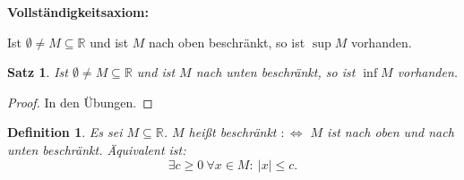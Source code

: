 \documentclass[12pt]{extreport} %
\newcommand{\R}{\mathbb{R}}
\theoremstyle{named}
\theoremstyle{itshape}
\newtheorem{satz}[unnamedtheorem]{Satz}
\newtheorem*{definition}{Definition}
\theoremstyle{normal}
\begin{document}
\textbf{Vollständigkeitsaxiom:}
\begin{description} \addtolength{\itemindent}{0.4cm}
	\item[$(A15)$]Ist $\emptyset \neq M \subseteq \R$ und ist $M$ nach oben beschränkt, so ist $\sup M$ vorhanden. \label{v.axiom-a15}
\end{description}

\begin{satz} \label{1.1:satz}
	Ist $\emptyset \neq M \subseteq \R$ und ist $M$ nach unten beschränkt, so ist $\inf M$ vorhanden.
\end{satz} 

\begin{proof}
	In den Übungen.
\end{proof}

\begin{definition}
	Es sei $M \subseteq \R$. $M$ hei{\ss}t beschränkt $:\iff$ $M$ ist nach oben und nach unten beschränkt. Äquivalent ist:
	$$
	\exists c \geq 0 ~\forall x \in M: \: |x| \leq c. 
	$$
\end{definition}
\end{document}
